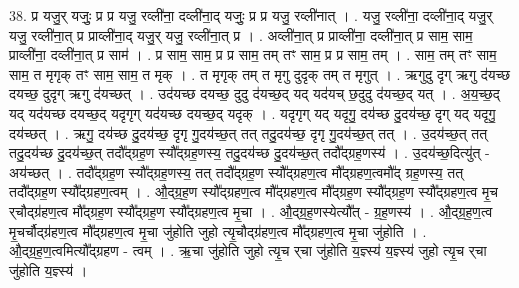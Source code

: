 \documentclass[17pt]{extarticle}
\begin{document}
38. प्र यजु॒र् यजुः॒ प्र प्र यजु॒ रव्ली॑ना॒ दव्ली॑ना॒द् यजुः॒ प्र प्र यजु॒ रव्ली॑नात् । . यजु॒ रव्ली॑ना॒ दव्ली॑ना॒द् यजु॒र् यजु॒ रव्ली॑ना॒त् प्र प्राव्ली॑ना॒द् यजु॒र् यजु॒ रव्ली॑ना॒त् प्र । . अव्ली॑ना॒त् प्र प्राव्ली॑ना॒ दव्ली॑ना॒त् प्र साम॒ साम॒ प्राव्ली॑ना॒ दव्ली॑ना॒त् प्र साम॑ । . प्र साम॒ साम॒ प्र प्र साम॒ तम् तꣳ साम॒ प्र प्र साम॒ तम् । . साम॒ तम् तꣳ साम॒ साम॒ त मृगृक् तꣳ साम॒ साम॒ त मृक् । . त मृगृक् तम् त मृगु दुदृक् तम् त मृगुत् । . ऋगुदु दृग् ऋगु द॑यच्छ दयच्छ॒ दुदृग् ऋगु द॑यच्छत् । . उद॑यच्छ दयच्छ॒ दुदु द॑यच्छ॒द् यद् यद॑यच् छ॒दुदु द॑यच्छ॒द् यत् । . अ॒य॒च्छ॒द् यद् यद॑यच्छ दयच्छ॒द् यदृगृग् यद॑यच्छ दयच्छ॒द् यदृक् । . यदृगृग् यद् यदृगु॒ दय॑च्छ दु॒दय॑च्छ॒ दृग् यद् यदृगु॒ दय॑च्छत् । . ऋगु॒ दय॑च्छ दु॒दय॑च्छ॒ दृगृ गु॒दय॑च्छ॒त् तत् तदु॒दय॑च्छ॒ दृगृ गु॒दय॑च्छ॒त् तत् । . उ॒दय॑च्छ॒त् तत् तदु॒दय॑च्छ दु॒दय॑च्छ॒त् तदौ᳚द्ग्रह॒ण स्यौ᳚द्ग्रह॒णस्य॒ तदु॒दय॑च्छ दु॒दय॑च्छ॒त् तदौ᳚द्ग्रह॒णस्य॑ । . उ॒दय॑च्छ॒दित्यु॑त् - अय॑च्छत् । . तदौ᳚द्ग्रह॒ण स्यौ᳚द्ग्रह॒णस्य॒ तत् तदौ᳚द्ग्रह॒ण स्यौ᳚द्ग्रहण॒त्व मौ᳚द्ग्रहण॒त्वमौ᳚द् ग्रह॒णस्य॒ तत् तदौ᳚द्ग्रह॒ण स्यौ᳚द्ग्रहण॒त्वम् । . औ॒द्ग्र॒ह॒ण स्यौ᳚द्ग्रहण॒त्व मौ᳚द्ग्रहण॒त्व मौ᳚द्ग्रह॒ण स्यौ᳚द्ग्रह॒ण स्यौ᳚द्ग्रहण॒त्व मृ॒च र्‌चौद्ग्र॑हण॒त्व मौ᳚द्ग्रह॒ण स्यौ᳚द्ग्रह॒ण स्यौ᳚द्ग्रहण॒त्व मृ॒चा । . औ॒द्ग्र॒ह॒णस्येत्यौ᳚त् - ग्र॒ह॒णस्य॑ । . औ॒द्ग्र॒ह॒ण॒त्व मृ॒चर्चौद्ग्र॑हण॒त्व मौ᳚द्ग्रहण॒त्व मृ॒चा जु॑होति जुहो त्यृ॒चौद्ग्र॑हण॒त्व मौ᳚द्ग्रहण॒त्व मृ॒चा जु॑होति । . औ॒द्ग्र॒ह॒ण॒त्वमित्यौ᳚द्ग्रहण - त्वम् । . ऋ॒चा जु॑होति जुहो त्यृ॒च र्‌चा जु॑होति य॒ज्ञ्स्य॑ य॒ज्ञ्स्य॑ जुहो त्यृ॒च र्‌चा जु॑होति य॒ज्ञ्स्य॑ । \newline
\pagebreak
{}
\end{document}
